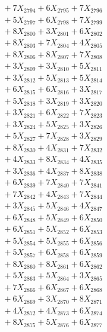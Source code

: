 \documentclass[a4paper,10pt]{article}
\begin{document}
{\begin{align}
&\;  + 7 X_{2794} + 6 X_{2795} + 7 X_{2796} \\[0.3ex]
&\;  + 5 X_{2797} + 6 X_{2798} + 7 X_{2799} \\[0.5ex]\allowbreak
&\;  + 8 X_{2800} + 3 X_{2801} + 6 X_{2802} \\[0.3ex]
&\;  + 8 X_{2803} + 7 X_{2804} + 4 X_{2805} \\[0.3ex]
&\;  + 8 X_{2806} + 8 X_{2807} + 7 X_{2808} \\[0.3ex]
&\;  + 3 X_{2809} + 3 X_{2810} + 5 X_{2811} \\[0.3ex]
&\;  + 3 X_{2812} + 5 X_{2813} + 5 X_{2814} \\[0.3ex]
&\;  + 6 X_{2815} + 6 X_{2816} + 3 X_{2817} \\[0.3ex]
&\;  + 5 X_{2818} + 3 X_{2819} + 3 X_{2820} \\[0.3ex]
&\;  + 3 X_{2821} + 6 X_{2822} + 7 X_{2823} \\[0.3ex]
&\;  + 3 X_{2824} + 5 X_{2825} + 3 X_{2826} \\[0.3ex]
&\;  + 5 X_{2827} + 7 X_{2828} + 3 X_{2829} \\[0.5ex]\allowbreak
&\;  + 8 X_{2830} + 4 X_{2831} + 7 X_{2832} \\[0.3ex]
&\;  + 4 X_{2833} + 8 X_{2834} + 4 X_{2835} \\[0.3ex]
&\;  + 3 X_{2836} + 4 X_{2837} + 8 X_{2838} \\[0.3ex]
&\;  + 6 X_{2839} + 7 X_{2840} + 7 X_{2841} \\[0.3ex]
&\;  + 7 X_{2842} + 4 X_{2843} + 7 X_{2844} \\[0.3ex]
&\;  + 3 X_{2845} + 5 X_{2846} + 4 X_{2847} \\[0.3ex]
&\;  + 6 X_{2848} + 5 X_{2849} + 6 X_{2850} \\[0.3ex]
&\;  + 6 X_{2851} + 5 X_{2852} + 6 X_{2853} \\[0.3ex]
&\;  + 5 X_{2854} + 5 X_{2855} + 6 X_{2856} \\[0.3ex]
&\;  + 5 X_{2857} + 6 X_{2858} + 6 X_{2859} \\[0.5ex]\allowbreak
&\;  + 8 X_{2860} + 8 X_{2861} + 6 X_{2862} \\[0.3ex]
&\;  + 5 X_{2863} + 5 X_{2864} + 3 X_{2865} \\[0.3ex]
&\;  + 7 X_{2866} + 6 X_{2867} + 6 X_{2868} \\[0.3ex]
&\;  + 6 X_{2869} + 3 X_{2870} + 8 X_{2871} \\[0.3ex]
&\;  + 4 X_{2872} + 4 X_{2873} + 6 X_{2874} \\[0.3ex]
&\;  + 8 X_{2875} + 5 X_{2876} + 6 X_{2877} \\[0.3ex]

\end{align}}
\end{document}
